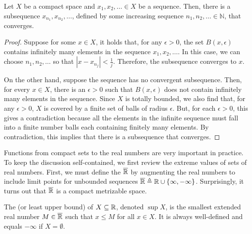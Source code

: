 \begin{theorem}
Let $X$ be a compact space and $x_1,x_2,\ldots \in X$ be a sequence.
Then, there is a subsequence $x_{n_1},x_{n_2},\ldots$, defined by some increasing sequence $n_1,n_2,\ldots \in \mathbb{N}$, that converges.
\end{theorem}
\begin{proof}
Suppose for some $x\in X$, it holds that, for any $\epsilon > 0$, the set $B(x,\epsilon)$ contains infinitely many elements in the sequence $x_1,x_2,\ldots$.
In this case, we can choose $n_1,n_2,\ldots$ so that $|x\! -\! x_{n_j}|\! <\! \frac{1}{j}$.
Therefore, the subsequence converges to $x$.

On the other hand, suppose the sequence has no convergent subsequence.
Then, for every $x\in X$, there is an $\epsilon >0$ such that $B(x,\epsilon)$ does not contain infinitely many elements in the sequence.
Since $X$ is totally bounded, we also find that, for any $\epsilon >0$, $X$ is covered by a finite set of balls of radius $\epsilon$.
But, for each $\epsilon >0$, this gives a contradiction because all the elements in the infinite sequence must fall into a finite number balls each containing finitely many elements.
By contradiction, this implies that there is a subsequence that converges.
\end{proof}

Functions from compact sets to the real numbers are very important in practice.
To keep the discussion self-contained, we first review the extreme values of sets of real numbers.
First, we must define the  $\overline{\mathbb{R}}$ by augmenting the real numbers to include limit points for unbounded sequences $\overline{\mathbb{R}} \triangleq \mathbb{R} \cup \{ \infty,-\infty\}$.
Surprisingly, it turns out that $\overline{\mathbb{R}}$ is a compact metrizable space.

\begin{definition}
The  (or least upper bound) of $X\subseteq \mathbb{R}$, denoted $\sup X$, is the smallest extended real number $M \in \overline{\mathbb{R}}$ such that $x\leq M$ for all $x\in X$.
It is always well-defined and equals $-\infty$ if $X=\emptyset$.
\end{definition}

